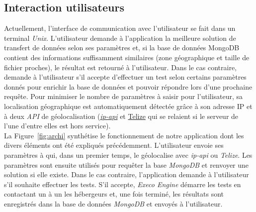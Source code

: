 \documentclass[10pt]{article}
\newcommand{\execoE}{\textit{Execo Engine}\xspace}
\newcommand{\ipapi}{\textit{ip-api}\xspace}
\begin{document}
\subsection{Interaction utilisateurs}

Actuellement, l'interface de communication avec l'utilisateur se fait dans un
terminal \textit{Unix}. L'utilisateur demande à l'application la meilleure
solution de transfert de données selon ses paramètres et, si la base de données
MongoDB contient des informations suffisamment similaires (zone géographique et
taille de fichier proches), le résultat est retourné à l'utilisateur. Dans le
cas contraire, \KYD demande à l'utilisateur s'il accepte d'effectuer un
test selon certains paramètres donnés pour enrichir la base de données et
pouvoir répondre lors d'une prochaine requête. Pour minimiser le nombre de
paramètres à saisir pour l'utilisateur, sa localisation géographique est
automatiquement détectée grâce à son adresse IP et à deux \textit{API} de
géolocalisation (\href{http://ip-api.com/docs/api:json}{\ipapi} et
\href{http://www.telize.com/}{Telize} qui se relaient si le serveur de l'une
d'entre elles est hors service).\\

La Figure~\ref{fig:archi} synthétise le fonctionnement de notre application dont les
divers éléments ont été expliqués précédemment. L'utilisateur envoie ses
paramètres à \KYD qui, dans un premier temps, le géolocalise avec
\ipapi ou \textit{Telize}. Les paramètres sont ensuite utilisés pour
requêter la base \textit{MongoDB} et renvoyer une solution si elle existe. Dans
le cas contraire, l'application demande à l'utilisateur s'il souhaite effectuer
les tests. S'il accepte, \execoE démarre les tests en contactant un à un
les hébergeurs et, une fois terminé, les résultats sont enregistrés dans la
base de données \textit{MongoDB} et envoyés à l'utilisateur.
\end{document}
